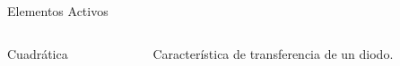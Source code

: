\documentclass[10pt,t,aspectratio=169]{beamer}
\begin{document}
\begin{frame}{Elementos Activos}
\begin{columns}
\begin{column}[t]{0.7\textwidth}
{\begin{columns}
\begin{column}[t]{3cm}
        Cuadrática
      \end{column}
    \end{columns}
    }
  \end{column}
  \begin{column}[t]{0.3\textwidth}
    \begin{figure}[H]
      \centering
      \pgfplotsset{width=\textwidth,compat=1.9}
      \small{Característica de transferencia de un diodo.}
    \end{figure}
  \end{column}
\end{columns}
\end{frame}
\end{document}
